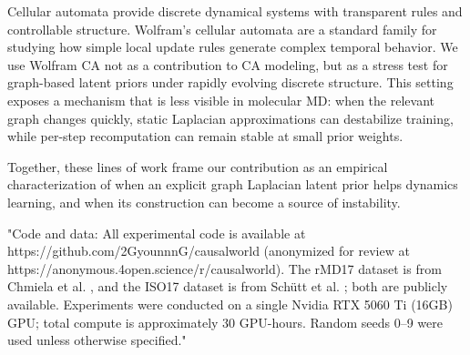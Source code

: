 Cellular automata provide discrete dynamical systems with transparent rules and controllable structure. Wolfram's cellular automata \cite{wolfram2002} are a standard family for studying how simple local update rules generate complex temporal behavior. We use Wolfram CA not as a contribution to CA modeling, but as a stress test for graph-based latent priors under rapidly evolving discrete structure. This setting exposes a mechanism that is less visible in molecular MD: when the relevant graph changes quickly, static Laplacian approximations can destabilize training, while per-step recomputation can remain stable at small prior weights.

Together, these lines of work frame our contribution as an empirical characterization of when an explicit graph Laplacian latent prior helps dynamics learning, and when its construction can become a source of instability.

"Code and data: All experimental code is available at https://github.com/2GyounnnG/causalworld 
(anonymized for review at https://anonymous.4open.science/r/causalworld). 
The rMD17 dataset is from Chmiela et al. \cite{chmiela2017}, and the ISO17 
dataset is from Schütt et al. \cite{schnet2017}; both are publicly available. 
Experiments were conducted on a single Nvidia RTX 5060 Ti (16GB) GPU; total 
compute is approximately 30 GPU-hours. Random seeds 0–9 were used unless 
otherwise specified."
